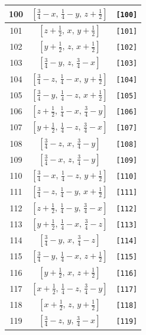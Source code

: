 \documentclass[fleqn,8pt]{jsarticle}
\begin{document}
\begin{longtable}{ccc}
100 & $\left[ \frac{3}{4} - x,\, \frac{1}{4} - y,\, z + \frac{1}{2} \right]$ & {\tt [100]} \\ \hline
101 & $\left[ z + \frac{1}{2},\, x,\, y + \frac{1}{2} \right]$ & {\tt [101]} \\ \hline
102 & $\left[ y + \frac{1}{2},\, z,\, x + \frac{1}{2} \right]$ & {\tt [102]} \\ \hline
103 & $\left[ \frac{3}{4} - y,\, z,\, \frac{3}{4} - x \right]$ & {\tt [103]} \\ \hline
104 & $\left[ \frac{3}{4} - z,\, \frac{1}{4} - x,\, y + \frac{1}{2} \right]$ & {\tt [104]} \\ \hline
105 & $\left[ \frac{3}{4} - y,\, \frac{1}{4} - z,\, x + \frac{1}{2} \right]$ & {\tt [105]} \\ \hline
106 & $\left[ z + \frac{1}{2},\, \frac{1}{4} - x,\, \frac{3}{4} - y \right]$ & {\tt [106]} \\ \hline
107 & $\left[ y + \frac{1}{2},\, \frac{1}{4} - z,\, \frac{3}{4} - x \right]$ & {\tt [107]} \\ \hline
108 & $\left[ \frac{3}{4} - z,\, x,\, \frac{3}{4} - y \right]$ & {\tt [108]} \\ \hline
109 & $\left[ \frac{3}{4} - x,\, z,\, \frac{3}{4} - y \right]$ & {\tt [109]} \\ \hline
110 & $\left[ \frac{3}{4} - x,\, \frac{1}{4} - z,\, y + \frac{1}{2} \right]$ & {\tt [110]} \\ \hline
111 & $\left[ \frac{3}{4} - z,\, \frac{1}{4} - y,\, x + \frac{1}{2} \right]$ & {\tt [111]} \\ \hline
112 & $\left[ z + \frac{1}{2},\, \frac{1}{4} - y,\, \frac{3}{4} - x \right]$ & {\tt [112]} \\ \hline
113 & $\left[ y + \frac{1}{2},\, \frac{1}{4} - x,\, \frac{3}{4} - z \right]$ & {\tt [113]} \\ \hline
114 & $\left[ \frac{3}{4} - y,\, x,\, \frac{3}{4} - z \right]$ & {\tt [114]} \\ \hline
115 & $\left[ \frac{3}{4} - y,\, \frac{1}{4} - x,\, z + \frac{1}{2} \right]$ & {\tt [115]} \\ \hline
116 & $\left[ y + \frac{1}{2},\, x,\, z + \frac{1}{2} \right]$ & {\tt [116]} \\ \hline
117 & $\left[ x + \frac{1}{2},\, \frac{1}{4} - z,\, \frac{3}{4} - y \right]$ & {\tt [117]} \\ \hline
118 & $\left[ x + \frac{1}{2},\, z,\, y + \frac{1}{2} \right]$ & {\tt [118]} \\ \hline
119 & $\left[ \frac{3}{4} - z,\, y,\, \frac{3}{4} - x \right]$ & {\tt [119]} \\ \hline

\end{longtable}
\end{document}
